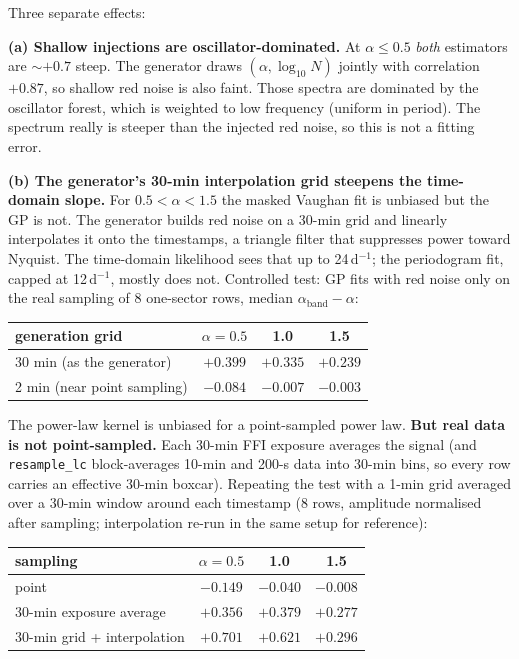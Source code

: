 \documentclass[11pt]{article}
\newcommand{\code}[1]{\texttt{#1}}
\begin{document}
Three separate effects:

\textbf{(a) Shallow injections are oscillator-dominated.} At $\alpha\le0.5$ \emph{both}
estimators are $\sim+0.7$ steep. The generator draws $(\alpha, \log_{10}N)$ jointly with
correlation $+0.87$, so shallow red noise is also faint. Those spectra are dominated by
the oscillator forest, which is weighted to low frequency (uniform in period). The
spectrum really is steeper than the injected red noise, so this is not a fitting error.

\textbf{(b) The generator's 30-min interpolation grid steepens the time-domain slope.}
For $0.5<\alpha<1.5$ the masked Vaughan fit is unbiased but the GP is not. The generator
builds red noise on a 30-min grid and linearly interpolates it onto the timestamps, a
triangle filter that suppresses power toward Nyquist. The time-domain likelihood sees that
up to 24\,d$^{-1}$; the periodogram fit, capped at 12\,d$^{-1}$, mostly does not.
Controlled test: GP fits with red noise only on the real sampling of 8 one-sector rows,
median $\alpha_\mathrm{band}-\alpha$:

\begin{center}
\begin{tabular}{lccc}
\toprule
generation grid & $\alpha=0.5$ & 1.0 & 1.5 \\
\midrule
30 min (as the generator) & $+0.399$ & $+0.335$ & $+0.239$ \\
2 min (near point sampling) & $-0.084$ & $-0.007$ & $-0.003$ \\
\bottomrule
\end{tabular}
\end{center}

The power-law kernel is unbiased for a point-sampled power law. \textbf{But real data is
not point-sampled.} Each 30-min FFI exposure averages the signal (and \code{resample\_lc}
block-averages 10-min and 200-s data into 30-min bins, so every row carries an effective
30-min boxcar). Repeating the test with a 1-min grid averaged over a 30-min window around
each timestamp (8 rows, amplitude normalised after sampling; interpolation re-run in the
same setup for reference):

\begin{center}
\begin{tabular}{lccc}
\toprule
sampling & $\alpha=0.5$ & 1.0 & 1.5 \\
\midrule
point                        & $-0.149$ & $-0.040$ & $-0.008$ \\
30-min exposure average      & $+0.356$ & $+0.379$ & $+0.277$ \\
30-min grid + interpolation  & $+0.701$ & $+0.621$ & $+0.296$ \\
\bottomrule
\end{tabular}
\end{center}
\end{document}
